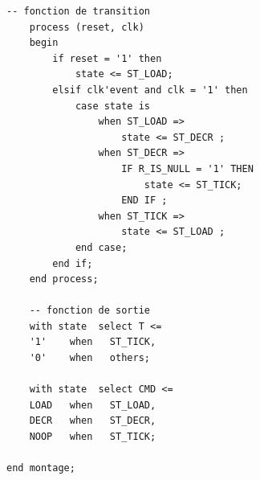\documentclass[10pt]{article}
\begin{document}
\begin{lstlisting}[style=vhdl]
    -- fonction de transition    
	process (reset, clk)
	begin
		if reset = '1' then
			state <= ST_LOAD;
		elsif clk'event and clk = '1' then
			case state is
				when ST_LOAD =>
					state <= ST_DECR ;
				when ST_DECR =>
					IF R_IS_NULL = '1' THEN
						state <= ST_TICK;
					END IF ;
				when ST_TICK =>
					state <= ST_LOAD ;
			end case;
		end if;
	end process;

    -- fonction de sortie    
	with state  select T <=
	'1'    when   ST_TICK,
	'0'    when   others;

	with state  select CMD <=
	LOAD   when   ST_LOAD,
	DECR   when   ST_DECR,
	NOOP   when   ST_TICK;

end montage;


\end{lstlisting}
\end{document}
